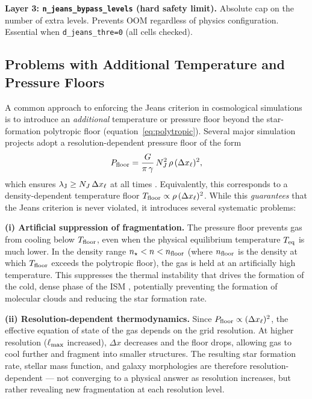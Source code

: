 \documentclass[fleqn,usenatbib]{mnras}
\newcommand{\lJ}{\lambda_{\rm J}}
\newcommand{\nstar}{n_\star}
\newcommand{\dx}{\Delta x}
\newcommand{\code}[1]{\texttt{#1}}
\begin{document}
\textbf{Layer 3: \code{n\_jeans\_bypass\_levels} (hard safety limit).}
Absolute cap on the number of extra levels.  Prevents OOM regardless
of physics configuration.  Essential when
\code{d\_jeans\_thre=0} (all cells checked).


\subsection{Problems with Additional Temperature and Pressure Floors}
\label{sec:pfloor}

A common approach to enforcing the Jeans criterion in cosmological
simulations is to introduce an \emph{additional} temperature or
pressure floor beyond the star-formation polytropic floor
(equation~\ref{eq:polytropic}).  Several major simulation projects
adopt a resolution-dependent pressure floor of the form
\begin{equation}
  P_{\rm floor} = \frac{G}{\pi\,\gamma}\,
  N_J^2\,\rho\,(\dx_\ell)^2,
  \label{eq:pfloor}
\end{equation}
which ensures $\lJ \ge N_J\,\dx_\ell$ at all times
\citep[e.g.][]{Schaye2015, Hopkins2018}.  Equivalently, this
corresponds to a density-dependent temperature floor
$T_{\rm floor} \propto \rho\,(\dx_\ell)^2$.  While this
\emph{guarantees} that the Jeans criterion is never violated, it
introduces several systematic problems:

\textbf{(i) Artificial suppression of fragmentation.}
The pressure floor prevents gas from cooling below $T_{\rm floor}$,
even when the physical equilibrium temperature $T_{\rm eq}$ is much
lower.  In the density range $\nstar < n < n_{\rm floor}$ (where
$n_{\rm floor}$ is the density at which $T_{\rm floor}$ exceeds the
polytropic floor), the gas is held at an artificially high
temperature.  This suppresses the thermal instability that drives
the formation of the cold, dense phase of the ISM
\citep{Sutherland1993, Wiersma2009}, potentially preventing the
formation of molecular clouds and reducing the star formation rate.

\textbf{(ii) Resolution-dependent thermodynamics.}
Since $P_{\rm floor} \propto (\dx_\ell)^2$, the effective equation
of state of the gas depends on the grid resolution.  At higher
resolution ($\ell_{\rm max}$ increased), $\dx$ decreases and the floor
drops, allowing gas to cool further and fragment into smaller
structures.  The resulting star formation rate, stellar mass function,
and galaxy morphologies are therefore resolution-dependent --- not
converging to a physical answer as resolution increases, but rather
revealing new fragmentation at each resolution level.
\end{document}
